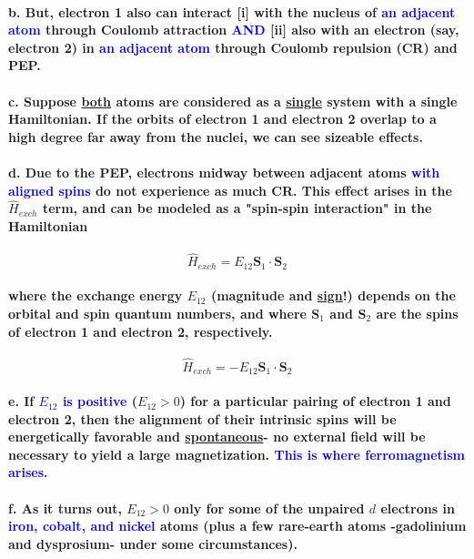 \documentclass{article}
\begin{document}
\paragraph{\indent b. But, electron 1 also can interact [i] with the nucleus of \textcolor{blue}{an adjacent atom} through Coulomb attraction \textcolor{blue}{AND} [ii] also with an electron (say, electron 2) in \textcolor{blue}{an adjacent atom} through Coulomb repulsion (CR) and PEP.}
\paragraph{\indent c. Suppose \underline{both} atoms are considered as a \underline{single} system with a single Hamiltonian. If the orbits of electron 1 and electron 2 overlap to a high degree far away from the nuclei, we can see sizeable effects. }
\paragraph{\indent d. Due to the PEP, electrons midway between adjacent atoms \textcolor{blue}{with aligned spins} do not experience as much CR. This effect arises in the $\hat{H}_{exch}$ term, and can be modeled as a "spin-spin interaction" in the Hamiltonian}
\begin{equation*}
    \hat{H}_{exch}=E_{1 2}\boldsymbol{S}_1\cdot\boldsymbol{S}_2
\end{equation*}
\paragraph{where the exchange energy $E_{12}$ (magnitude and \underline{sign}!) depends on the orbital and spin quantum numbers, and where $\boldsymbol{S}_1$ and $\boldsymbol{S}_2$ are the spins of electron 1 and electron 2, respectively.}
\begin{equation*}
    \hat{H}_{exch}=-E_{12}\boldsymbol{S}_1\cdot\boldsymbol{S}_2
\end{equation*}
\paragraph{\indent e. If \textcolor{blue}{$E_{12}$ is positive} ($E_{12}>0$) for a particular pairing of electron 1 and electron 2, then the alignment of their intrinsic spins will be energetically favorable and \underline{spontaneous}- no external field will be necessary to yield a large magnetization. \textcolor{blue}{This is where ferromagnetism arises}.}
\paragraph{\indent f. As it turns out, $E_{12}>0$ only for some of the unpaired $d$ electrons in \textcolor{blue}{iron, cobalt, and nickel} atoms (plus a few rare-earth atoms -gadolinium and dysprosium- under some circumstances).}
\end{document}
